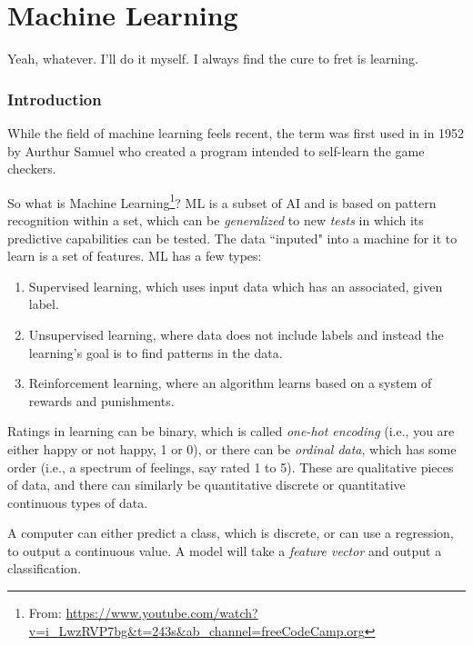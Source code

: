 \chapter{Machine Learning}

Yeah, whatever. I'll do it myself. I always find the cure to fret is learning.\newline


\subsection{Introduction}

While the field of machine learning feels recent, the term was first used in in 1952 by Aurthur Samuel who created a program intended to self-learn the game checkers.\newline


So what is Machine Learning\footnote{From: \url{https://www.youtube.com/watch?v=i_LwzRVP7bg&t=243s&ab_channel=freeCodeCamp.org}}? ML is a subset of AI and is based on pattern recognition within a set, which can be \textit{generalized} to new \textit{tests} in which its predictive capabilities can be tested. The data ``inputed" into a machine for it to learn is a set of features. ML has a few types:


\begin{enumerate}
    \item Supervised learning, which uses input data which has an associated, given label. 
    \item Unsupervised learning, where data does not include labels and instead the learning's goal is to find patterns in the data. 
    \item Reinforcement learning, where an algorithm learns based on a system of rewards and punishments. 
\end{enumerate}

Ratings in learning can be binary, which is called \textit{one-hot encoding} (i.e., you are either happy or not happy, 1 or 0), or there can be \textit{ordinal data}, which has some order (i.e., a spectrum of feelings, say rated 1 to 5). These are qualitative pieces of data, and there can similarly be quantitative discrete or quantitative continuous types of data.\newline

A computer can either predict a class, which is discrete, or can use a regression, to output a continuous value. A model will take a \textit{feature vector} and output a classification. 


